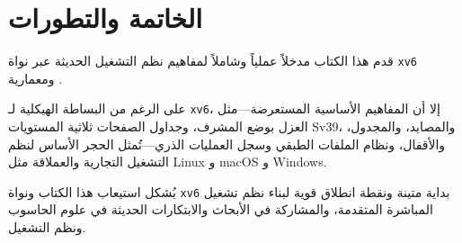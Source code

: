 \chapter{الخاتمة والتطورات}
\label{chap:sum}

قدم هذا الكتاب مدخلاً عملياً وشاملاً لمفاهيم نظم التشغيل الحديثة عبر نواة \texttt{xv6} ومعمارية .

على الرغم من البساطة الهيكلية لـ \texttt{xv6}، إلا أن المفاهيم الأساسية المستعرضة—مثل العزل بوضع المشرف، وجداول الصفحات ثلاثية المستويات Sv39، والمصايد، والمجدول، والأقفال، ونظام الملفات الطبقي وسجل العمليات الذري—تُمثل الحجر الأساس لنظم التشغيل التجارية والعملاقة مثل Linux و macOS و Windows.

يُشكل استيعاب هذا الكتاب ونواة \texttt{xv6} بداية متينة ونقطة انطلاق قوية لبناء نظم تشغيل المباشرة المتقدمة، والمشاركة في الأبحاث والابتكارات الحديثة في علوم الحاسوب ونظم التشغيل.
